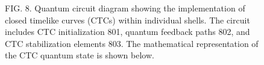 \documentclass[12pt,letterpaper]{article}
\begin{document}
\begin{figure}[H]
\caption*{FIG. 8. Quantum circuit diagram showing the implementation of closed timelike curves (CTCs) within individual shells. The circuit includes CTC initialization 801, quantum feedback paths 802, and CTC stabilization elements 803. The mathematical representation of the CTC quantum state is shown below.}
\end{figure}
\end{document}

